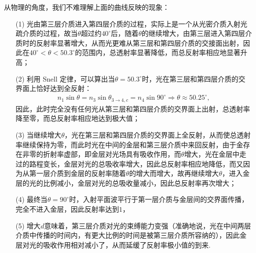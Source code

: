 \documentclass{assignment}
\begin{document}
\begin{sol}
    从物理的角度，我们不难理解上面的曲线反映的现象：
    \begin{itemize}
        \item[(1)] 光由第三层介质进入第四层介质的过程，实际上是一个从光密介质入射光疏介质的过程，故当$\theta$超过约$40^{\circ}$后，随着$\theta$的继续增大，由第三层进入第四层介质时的反射率显著增大，从而光更难从第三层和第四层介质的交接面出射，因此在$40^{\circ}<\theta<50.3^{\circ}$的范围内，总透射率显著降低，而总反射率相应地显著升高；
        \item[(2)] 利用 Snell 定律，可以算出当$\theta=50.3^{\circ}$时，光在第三层和第四层介质的交界面上恰好达到全反射：
        \begin{align}
            n_1\sin\theta=n_3\sin\theta_{3\rightarrow 4,c}=n_4\sin 90^{\circ}\Longrightarrow\theta\approx 50.25^{\circ},
        \end{align}
        因此，此时完全没有任何光从第三层和第四层介质的交界面上出射，总透射率降至零，而总反射率相应地达到极大值；
        \item[(3)] 当继续增大$\theta$，光在第三层和第四层介质的交界面上全反射，从而使总透射率继续保持为零，而此时光在中间的金层和第三层介质中来回反射，由于金存在非零的折射率虚部，即金层对光场具有吸收作用，而$\theta$增大，光在金层中走过的路程变长，金层对光的总吸收率增大，因此总反射率相应地降低，而又因为从第一层介质到金层的反射率随着$\theta$的增大而增大，故再继续增大$\theta$，进入金层的光的比例减小，金层对光的总吸收量减小，因此总反射率再次增大；
        \item[(4)] 最终当$\theta=90^{\circ}$时，入射平面波平行于第一层介质与金层间的交界面传播，完全不进入金层，因此反射率达到$1$，
        \item[(5)] 增大$d$意味着，第三层介质对光的束缚能力变强（准确地说，光在中间两层介质中传播的时间内，有更大比例的时间是被第三层介质所容纳的），因此金层对光的吸收作用相对减小了，从而延缓了反射率极小值的到来.
    \end{itemize}
\end{sol}



\end{document}
